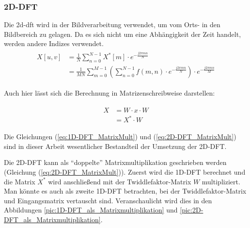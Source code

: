 \subsubsection{2D-DFT}\label{sec:2d-dft}
Die \gls{2d-dft} wird in der Bildverarbeitung verwendet, um vom Orts- in den Bildbereich zu gelagen. Da es sich nicht um eine Abhängigkeit 
der Zeit handelt, werden andere Indizes verwendet.
\begin{align}
\begin{split}
X[u,v] 	&= \frac{1}{N} \sum^{N-1}_{n=0} X^* \left[ m \right] \cdot e^{-\frac{j 2 \pi m n}{N}}\\
	&= \frac{1}{MN} \sum^{M-1}_{m=0} \left( \sum^{N-1}_{n=0} f(m,n) \cdot e^{-\frac{j 2 \pi m n}{N}} \right) \cdot e^{-\frac{j 2 \pi m n}{M}}
\end{split}
\end{align}

Auch hier lässt sich die Berechnung in Matrizenschreibweise darstellen:

\begin{align}
\begin{split}\label{eq:2D-DFT_MatrixMult}
 X &= W \cdot x \cdot W \\
                    &= X^* \cdot W
\end{split}
\end{align}

Die Gleichungen (\ref{eq:1D-DFT_MatrixMult}) und (\ref{eq:2D-DFT_MatrixMult}) sind in dieser Arbeit wesentlicher Bestandteil der Umsetzung der 2D-DFT.


Die 2D-DFT kann als ``doppelte'' Matrixmultiplikation geschrieben werden (Gleichung (\ref{eq:2D-DFT_MatrixMult})).
Zuerst wird die 1D-DFT berechnet und die Matrix $X^*$ wird anschließend mit der Twiddlefaktor-Matrix $W$ 
multipliziert. Man könnte es auch als zweite 1D-DFT betrachten, bei der Twiddlefaktor-Matrix und Eingangsmatrix vertauscht sind.
Veranschaulicht wird dies in den Abbildungen \ref{pic:1D-DFT_als_Matrixmultiplikation} und \ref{pic:2D-DFT_als_Matrixmultiplikation}.



